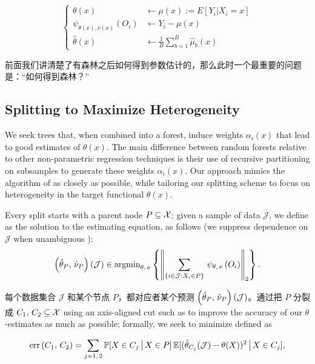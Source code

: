 \documentclass[aos]{imsart}
\theoremstyle{plain}
\theoremstyle{definition}
\theoremstyle{remark}
\begin{document}
\begin{CJK}{UTF8}{gbsn}
$$
\begin{cases}
\theta(x) &\leftarrow  \mu(x) := E[Y_i|X_i=x] \\
\psi_{\theta(x), \nu(x)}(O_i) &\leftarrow Y_i - \mu(x) \\
\hat{\theta}(x) &\leftarrow \frac{1}{B} \sum_{b=1}^B \hat{\mu}_b(x)
\end{cases}
$$


前面我们讲清楚了有森林之后如何得到参数估计的，那么此时一个最重要的问题是：“如何得到森林？”


\subsection{Splitting to Maximize Heterogeneity}

We seek trees that, when combined into a forest, induce weights
$\alpha_i(x)$ that lead to good estimates of $\theta(x)$. The main difference between random forests relative to other non-parametric regression techniques is their use of recursive partitioning on subsamples to generate these weights $\alpha_i(x)$. Our approach mimics the algorithm of \citet{breiman2001random} as closely as possible, while tailoring our splitting scheme to focus on heterogeneity in the target functional $\theta(x)$.

Every split starts with a parent node $P \subseteq \mathcal{X}$; given a sample of data $\mathcal{J}$, we define
 as the solution to the estimating equation, as follows
(we suppress dependence on $\mathcal{J}$ when unambiguous ):
\begin{equation}
\label{eq:leaf_solve}
\p{\htheta_P, \, \hnu_P}(\mathcal{J}) \in \argmin_{\theta, \, \nu} \cb{\Norm{\sum_{\cb{i\in\mathcal{J} : X_i \in P}} \, \psi_{\theta, \, \nu}\p{O_i}}_2}.
\end{equation}

每个数据集合 $\mathcal{J}$ 和某个节点 $P$，都对应者某个预测 $\left(\hat{\theta}_P, \, \hat{\nu}_P\right)(\mathcal{J})$。通过把 $P$ 分裂成 $C_1, \, C_2 \subseteq \mathcal{X}$ using an axis-aligned cut such as to improve the accuracy of our $\theta$-estimates as much as possible;
formally, we seek to minimize  defined as


$$
\operatorname{err}\left(C_1, \, C_2\right) = \sum_{j = 1, \, 2}
\mathbb{P}[X \in C_j \,\big|\, X \in P] \, \mathbb{E}[(\hat{\theta}_{C_j}(\mathcal{J}) - \theta(X))^2 \,\big|\, X \in C_j],
$$



\end{CJK}
\end{document}
